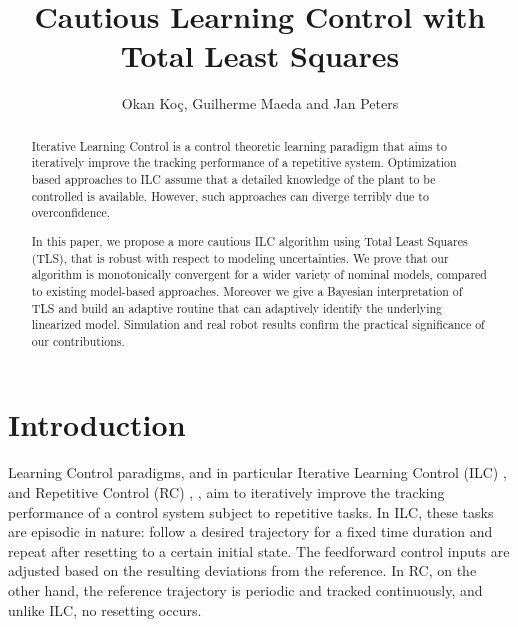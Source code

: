 \documentclass[10pt,a4paper]{article}
\author{Okan Ko\c c, Guilherme Maeda and Jan Peters}
\title{Cautious Learning Control with Total Least Squares}
\theoremstyle{plain}
\theoremstyle{definition}
\begin{document}
\maketitle
\thispagestyle{empty}
\pagestyle{empty}

\begin{abstract}

Iterative Learning Control is a control theoretic learning paradigm that aims to iteratively improve the tracking performance of a repetitive system. Optimization based approaches to ILC assume that a detailed knowledge of the plant to be controlled is available. However, such approaches can diverge terribly due to overconfidence. 

In this paper, we propose a more cautious ILC algorithm using Total Least Squares (TLS), that is robust with respect to modeling uncertainties. We prove that our algorithm is monotonically convergent for a wider variety of nominal models, compared to existing model-based approaches. Moreover we give a Bayesian interpretation of TLS and build an adaptive routine that can adaptively identify the underlying linearized model. Simulation and real robot results confirm the practical significance of our contributions. %
\end{abstract}



\section{Introduction}

Learning Control paradigms, and in particular Iterative Learning Control (ILC) \cite{Arimoto84}, \cite{Bristow06} and Repetitive Control (RC) \cite{Wang09}, \cite{Longman2000}, aim to iteratively improve the tracking performance of a control system subject to repetitive tasks. In ILC, these tasks are episodic in nature: follow a desired trajectory for a fixed time duration and repeat after resetting to a certain initial state. The feedforward control inputs are adjusted based on the resulting deviations from the reference. In RC, on the other hand, the reference trajectory is periodic and tracked continuously, and unlike ILC, no resetting occurs.
\end{document}
